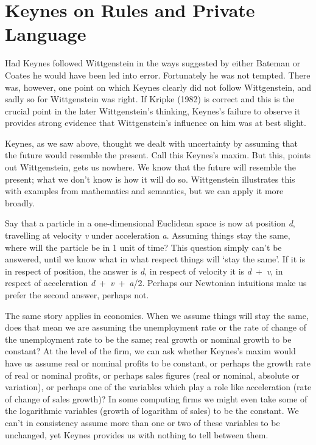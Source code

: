 \documentclass[noflushend]{philosophersimprint}
\begin{document}
\hypertarget{keynes-on-rules-and-private-language}{%
\section{Keynes on Rules and Private
Language}\label{keynes-on-rules-and-private-language}}

Had Keynes followed Wittgenstein in the ways suggested by either Bateman
or Coates he would have been led into error. Fortunately he was not
tempted. There was, however, one point on which Keynes clearly did not
follow Wittgenstein, and sadly so for Wittgenstein was right. If Kripke
(1982) is correct and this is the crucial point in the later
Wittgenstein's thinking, Keynes's failure to observe it provides strong
evidence that Wittgenstein's influence on him was at best slight.

Keynes, as we saw above, thought we dealt with uncertainty by assuming
that the future would resemble the present. Call this Keynes's maxim.
But this, points out Wittgenstein, gets us nowhere. We know that the
future will resemble the present; what we don't know is how it will do
so. Wittgenstein illustrates this with examples from mathematics and
semantics, but we can apply it more broadly.

Say that a particle in a one-dimensional Euclidean space is now at
position \emph{d}, travelling at velocity \emph{v} under acceleration
\emph{a}. Assuming things stay the same, where will the particle be in 1
unit of time? This question simply can't be answered, until we know what
in what respect things will `stay the same'. If it is in respect of
position, the answer is \emph{d}, in respect of velocity it is
\emph{d}~+~\emph{v}, in respect of acceleration
\emph{d}~+~\emph{v}~+~\emph{a}/2. Perhaps our Newtonian intuitions make
us prefer the second answer, perhaps not.

The same story applies in economics. When we assume things will stay the
same, does that mean we are assuming the unemployment rate or the rate
of change of the unemployment rate to be the same; real growth or
nominal growth to be constant? At the level of the firm, we can ask
whether Keynes's maxim would have us assume real or nominal profits to
be constant, or perhaps the growth rate of real or nominal profits, or
perhaps sales figures (real or nominal, absolute or variation), or
perhaps one of the variables which play a role like acceleration (rate
of change of sales growth)? In some computing firms we might even take
some of the logarithmic variables (growth of logarithm of sales) to be
the constant. We can't in consistency assume more than one or two of
these variables to be unchanged, yet Keynes provides us with nothing to
tell between them.
\end{document}
